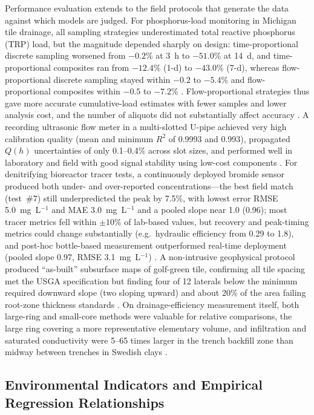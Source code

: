 Performance evaluation extends to the field protocols that generate the data
against which models are judged. For phosphorus-load monitoring in Michigan tile
drainage, all sampling strategies underestimated total reactive phosphorus (TRP)
load, but the magnitude depended sharply on design: time-proportional discrete
sampling worsened from $-0.2$\% at 3~h to $-51.0$\% at 14~d, and time-proportional
composites ran from $-12.4$\% (1-d) to $-43.0$\% (7-d), whereas flow-proportional
discrete sampling stayed within $-0.2$ to $-5.4$\% and flow-proportional
composites within $-0.5$ to $-7.2$\% \parencite{Dialameh2022}. Flow-proportional
strategies thus gave more accurate cumulative-load estimates with fewer samples
and lower analysis cost, and the number of aliquots did not substantially affect
accuracy \parencite{Dialameh2022}. A recording ultrasonic flow meter in a
multi-slotted U-pipe achieved very high calibration quality (mean and minimum
$R^2$ of 0.9993 and 0.993), propagated $Q(h)$ uncertainties of only 0.1--0.4\%
across slot sizes, and performed well in laboratory and field with good signal
stability using low-cost components \parencite{Enamorado2007}. For denitrifying
bioreactor tracer tests, a continuously deployed bromide sensor produced both
under- and over-reported concentrations---the best field match (test~\#7) still
underpredicted the peak by 7.5\%, with lowest error RMSE 5.0~mg~L$^{-1}$ and MAE
3.0~mg~L$^{-1}$ and a pooled slope near 1.0 (0.96); most tracer metrics fell
within $\pm10$\% of lab-based values, but recovery and peak-timing metrics could
change substantially (e.g.\ hydraulic efficiency from 0.29 to 1.8), and post-hoc
bottle-based measurement outperformed real-time deployment (pooled slope 0.97,
RMSE 3.1~mg~L$^{-1}$) \parencite{deOliveira2023b}. A non-intrusive geophysical
protocol produced ``as-built'' subsurface maps of golf-green tile, confirming
all tile spacing met the USGA specification but finding four of 12 laterals below
the minimum required downward slope (two sloping upward) and about 20\% of the
area failing root-zone thickness standards \parencite{Freeland2014}. On
drainage-efficiency measurement itself, both large-ring and small-core methods
were valuable for relative comparisons, the large ring covering a more
representative elementary volume, and infiltration and saturated conductivity
were 5--65 times larger in the trench backfill zone than midway between trenches
in Swedish clays \parencite{Messing2006}.

\subsection{Environmental Indicators and Empirical Regression Relationships}

